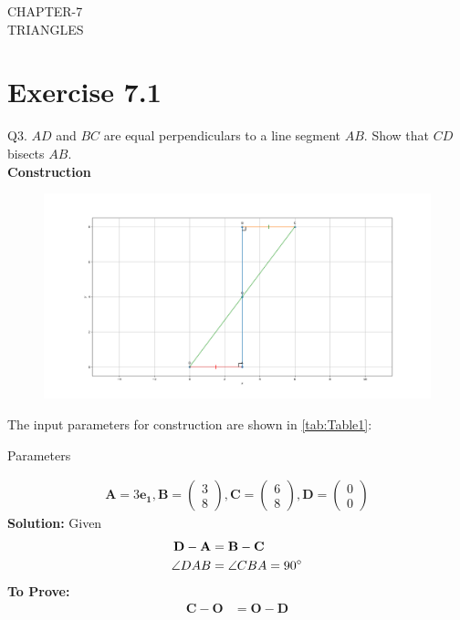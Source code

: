 \documentclass{article}
\newcommand{\solution}{\noindent \textbf{Solution: }}
\newcommand{\myvec}[1]{\ensuremath{\begin{pmatrix}#1\end{pmatrix}}}
\let\vec\mathbf
\begin{document}
\begin{center}
        \textbf\large{CHAPTER-7 \\ TRIANGLES}
\end{center}
\section{Exercise 7.1}
Q3. $AD$ and $BC$ are equal perpendiculars to a line segment $AB$. Show that $CD$ bisects $AB$.\\
\textbf{Construction}\\
\begin{figure}[h]
	\begin{center}
		\includegraphics[width=\columnwidth]{figs/Figure1.png}
	\end{center}
	\label{fig:Fig1}
\end{figure}
The input parameters for construction are shown in \ref{tab:Table1}:\\
\begin{table}[h]
	  \centering
	  
	  \caption{Parameters}
	  \label{tab:Table1}
\end{table}
\pagebreak
\begin{align}
	\vec{A} = 3\vec{e_1},\vec{B} = \myvec{3\\8},\vec{C} = \myvec{6\\8},\vec{D} = \myvec{0\\0}
\end{align}
\solution
Given
\begin{align}
	\vec{D}-\vec{A}&=\vec{B}-\vec{C}\\
	\angle DAB &= \angle CBA=90\degree
\end{align}
\textbf{To Prove:}\\
\begin{align}
	\vec{C}-\vec{O}&=\vec{O}-\vec{D}
\end{align}
\end{document}
